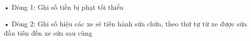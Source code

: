 • Dòng 1: Ghi số tiền bị phạt tối thiểu


• Dòng 2: Ghi số hiệu các xe sẽ tiến hành sửa chữa, theo thứ tự từ xe được sửa đầu tiên đến xe sửa sau cùng